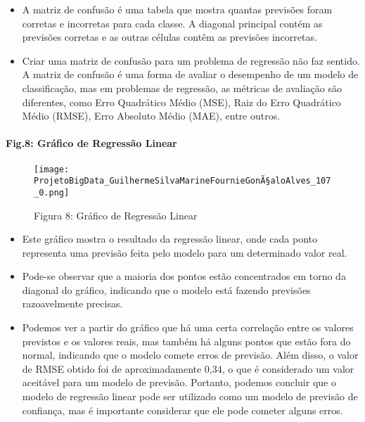 \documentclass[11pt]{article}
\providecommand{\tightlist}{%
      \setlength{\itemsep}{0pt}\setlength{\parskip}{0pt}}
\begin{document}
    \begin{itemize}
\tightlist
\item
  A matriz de confusão é uma tabela que mostra quantas previsões foram
  corretas e incorretas para cada classe. A diagonal principal contém as
  previsões corretas e as outras células contêm as previsões incorretas.
\item
  Criar uma matriz de confusão para um problema de regressão não faz
  sentido. A matriz de confusão é uma forma de avaliar o desempenho de
  um modelo de classificação, mas em problemas de regressão, as métricas
  de avaliação são diferentes, como Erro Quadrático Médio (MSE), Raiz do
  Erro Quadrático Médio (RMSE), Erro Absoluto Médio (MAE), entre outros.
\end{itemize}

    \hypertarget{gruxe1fico-de-regressuxe3o-linear}{%
\paragraph{Fig.8: Gráfico de Regressão
Linear}\label{gruxe1fico-de-regressuxe3o-linear}}

\begin{figure}[h]
   \centering
   \texttt{[image: ProjetoBigData\_GuilhermeSilvaMarineFournieGonÃ§aloAlves\_107\_0.png]}
   \pagebreak
    \caption{Figura 8: Gráfico de Regressão Linear}
    \pagebreak
   \label{fig:RegressãoLinear}
\end{figure}

    
    \begin{itemize}
\tightlist
\item
  Este gráfico mostra o resultado da regressão linear, onde cada ponto
  representa uma previsão feita pelo modelo para um determinado valor
  real.
\item
  Pode-se observar que a maioria dos pontos estão concentrados em torno
  da diagonal do gráfico, indicando que o modelo está fazendo previsões
  razoavelmente precisas.
\item
  Podemos ver a partir do gráfico que há uma certa correlação entre os
  valores previstos e os valores reais, mas também há alguns pontos que
  estão fora do normal, indicando que o modelo comete erros de previsão.
  Além disso, o valor de RMSE obtido foi de aproximadamente 0,34, o que
  é considerado um valor aceitável para um modelo de previsão. Portanto,
  podemos concluir que o modelo de regressão linear pode ser utilizado
  como um modelo de previsão de confiança, mas é importante considerar
  que ele pode cometer alguns erros.
\end{itemize}
\end{document}
